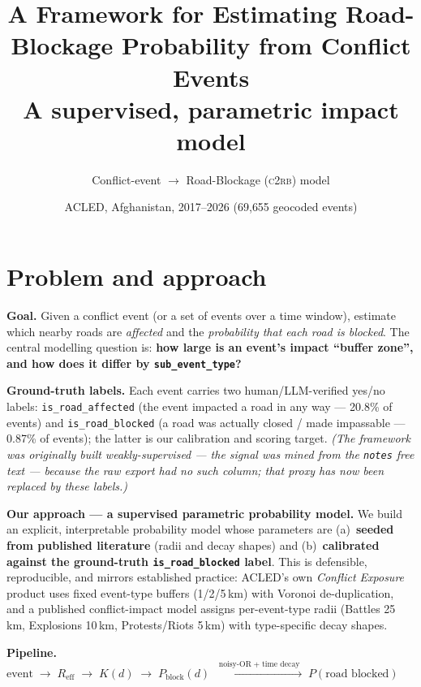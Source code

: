 \documentclass[11pt,a4paper]{article}
\title{\vspace{-1.2cm}\textbf{\color{NavyBlue} A Framework for Estimating Road-Blockage
Probability from Conflict Events}\\[2pt]
\large A supervised, parametric impact model}
\author{Conflict-event $\to$ Road-Blockage (\textsc{c2rb}) model}
\date{ACLED, Afghanistan, 2017--2026 \quad(69{,}655 geocoded events)}
\newcommand{\code}[1]{\texttt{\small #1}}
\newcommand{\Reff}{R_{\mathrm{eff}}}
\newcommand{\Pblock}{P_{\mathrm{block}}}
\begin{document}
\maketitle
\thispagestyle{fancy}
\vspace{-0.4cm}

\section{Problem and approach}

\textbf{Goal.} Given a conflict event (or a set of events over a time window), estimate which
nearby roads are \emph{affected} and the \emph{probability that each road is blocked}. The
central modelling question is: \textbf{how large is an event's impact ``buffer zone'', and how
does it differ by \code{sub\_event\_type}?}

\textbf{Ground-truth labels.} Each event carries two human/LLM-verified yes/no labels:
\code{is\_road\_affected} (the event impacted a road in any way --- 20.8\% of events) and
\code{is\_road\_blocked} (a road was actually closed / made impassable --- 0.87\% of events); the
latter is our calibration and scoring target. \emph{(The framework was originally built
weakly-supervised --- the signal was mined from the \code{notes} free text --- because the raw
export had no such column; that proxy has now been replaced by these labels.)}

\textbf{Our approach --- a supervised parametric probability model.} We build an explicit,
interpretable probability model whose parameters are (a)~\textbf{seeded from published
literature} (radii and decay shapes) and (b)~\textbf{calibrated against the ground-truth
\code{is\_road\_blocked} label}. This is defensible, reproducible, and mirrors established
practice: ACLED's own \emph{Conflict Exposure} product uses fixed event-type buffers
(1/2/5\,km) with Voronoi de-duplication, and a published conflict-impact model assigns
per-event-type radii (Battles 25\,km, Explosions 10\,km, Protests/Riots 5\,km) with
type-specific decay shapes.

\begin{notebox}
\textbf{Pipeline.}\quad
$\text{event}\;\longrightarrow\;\Reff\;\longrightarrow\;K(d)\;\longrightarrow\;
\Pblock(d)\;\xrightarrow{\;\text{noisy-OR}\;+\;\text{time decay}\;}\;P(\text{road blocked})$
\end{notebox}

\end{document}
